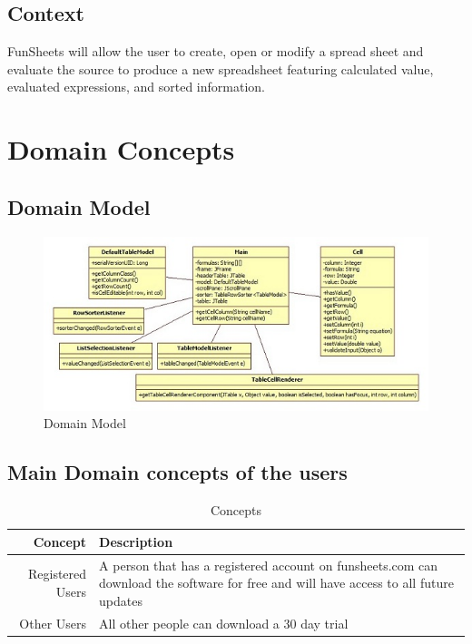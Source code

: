 \documentclass[12pt]{article}
\begin{document}
\subsection{Context}
FunSheets will allow the user to create, open or modify a spread sheet and evaluate the source to produce a new spreadsheet featuring calculated value, evaluated expressions, and sorted information.

\section{Domain Concepts}
\subsection{Domain Model}

\begin{figure}[htbp]
\includegraphics{DomainModel.jpg}
\caption{Domain Model}
\label{fig:Domain-model-diagram}
\end{figure}

\clearpage

\subsection{Main Domain concepts of the users}
\begin{table}[htbp]
\caption{Concepts}
\begin{center}
\begin{tabular}{|r | p{10cm}|}
\hline
Concept & Description \\\hline\hline
Registered Users & A person that has a registered account on funsheets.com can download the software for free and will have access to all future updates \\\hline\hline
Other Users & All other people can download a 30 day trial\\\hline
\end{tabular}
\end{center}
\end{table}
\end{document}
